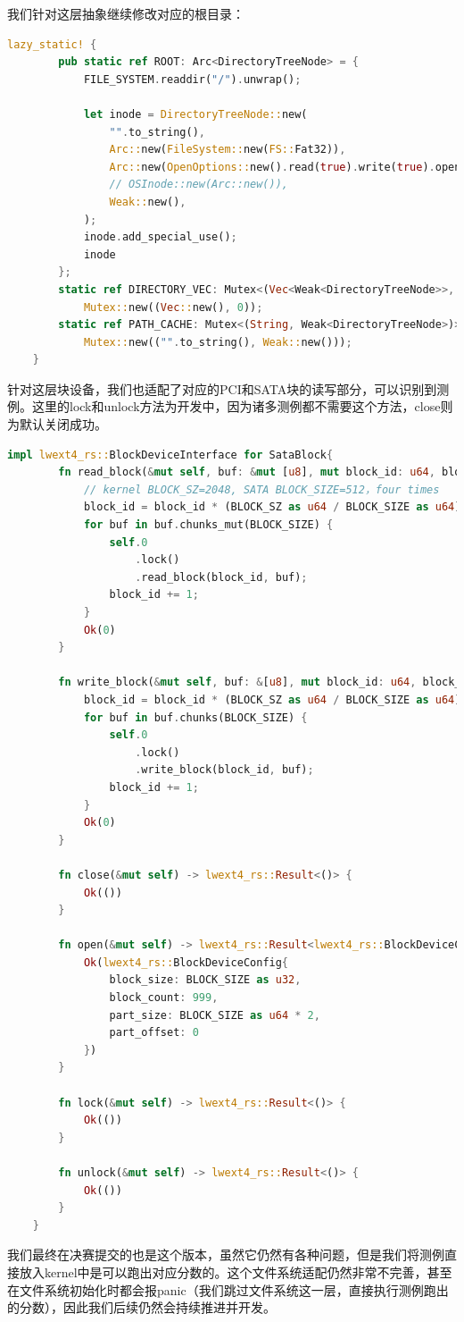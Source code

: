 我们针对这层抽象继续修改对应的根目录：
\begin{lstlisting}[language={Rust}, caption={ROOT修改}]
    lazy_static! {
        pub static ref ROOT: Arc<DirectoryTreeNode> = {
            FILE_SYSTEM.readdir("/").unwrap();
    
            let inode = DirectoryTreeNode::new(
                "".to_string(),
                Arc::new(FileSystem::new(FS::Fat32)),
                Arc::new(OpenOptions::new().read(true).write(true).open("/").unwrap()),
                // OSInode::new(Arc::new()),
                Weak::new(),
            );
            inode.add_special_use();
            inode
        };
        static ref DIRECTORY_VEC: Mutex<(Vec<Weak<DirectoryTreeNode>>, usize)> =
            Mutex::new((Vec::new(), 0));
        static ref PATH_CACHE: Mutex<(String, Weak<DirectoryTreeNode>)> =
            Mutex::new(("".to_string(), Weak::new()));
    }
    \end{lstlisting}

针对这层块设备，我们也适配了对应的PCI和SATA块的读写部分，可以识别到测例。这里的lock和unlock方法为开发中，因为诸多测例都不需要这个方法，close则为默认关闭成功。
\begin{lstlisting}[language={Rust}, caption={ROOT修改}]
    impl lwext4_rs::BlockDeviceInterface for SataBlock{
        fn read_block(&mut self, buf: &mut [u8], mut block_id: u64, block_count: u32) -> lwext4_rs::Result<usize> {
            // kernel BLOCK_SZ=2048, SATA BLOCK_SIZE=512，four times
            block_id = block_id * (BLOCK_SZ as u64 / BLOCK_SIZE as u64);
            for buf in buf.chunks_mut(BLOCK_SIZE) {
                self.0
                    .lock()
                    .read_block(block_id, buf);
                block_id += 1;
            }
            Ok(0)
        }
    
        fn write_block(&mut self, buf: &[u8], mut block_id: u64, block_count: u32) -> lwext4_rs::Result<usize> {
            block_id = block_id * (BLOCK_SZ as u64 / BLOCK_SIZE as u64);
            for buf in buf.chunks(BLOCK_SIZE) {
                self.0
                    .lock()
                    .write_block(block_id, buf);
                block_id += 1;
            }
            Ok(0)
        }
        
        fn close(&mut self) -> lwext4_rs::Result<()> {
            Ok(())
        }
    
        fn open(&mut self) -> lwext4_rs::Result<lwext4_rs::BlockDeviceConfig> {
            Ok(lwext4_rs::BlockDeviceConfig{
                block_size: BLOCK_SIZE as u32,
                block_count: 999,
                part_size: BLOCK_SIZE as u64 * 2,
                part_offset: 0
            })
        }
    
        fn lock(&mut self) -> lwext4_rs::Result<()> {
            Ok(())
        }
    
        fn unlock(&mut self) -> lwext4_rs::Result<()> {
            Ok(())
        }
    }
    \end{lstlisting}
    
我们最终在决赛提交的也是这个版本，虽然它仍然有各种问题，但是我们将测例直接放入kernel中是可以跑出对应分数的。这个文件系统适配仍然非常不完善，甚至在文件系统初始化时都会报panic（我们跳过文件系统这一层，直接执行测例跑出的分数），因此我们后续仍然会持续推进并开发。